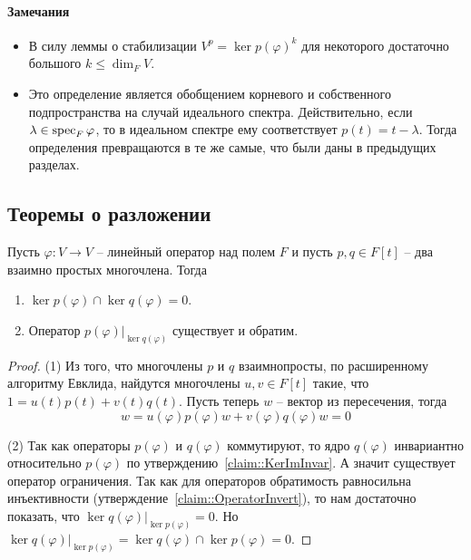 \paragraph{Замечания}
\begin{itemize}
\item В силу леммы о стабилизации $V^p = \ker p(\varphi)^k$ для некоторого достаточно большого $k\leqslant \dim_F V$.

\item Это определение является обобщением корневого и собственного подпространства на случай идеального спектра. Действительно, если $\lambda\in\operatorname{spec}_F \varphi$, то в идеальном спектре ему соответствует $p(t) = t - \lambda$. Тогда определения превращаются в те же самые, что были даны в предыдущих разделах.
\end{itemize}

\subsection{Теоремы о разложении}


\begin{claim}\label{claim::CoprimeKernels}
Пусть $\varphi\colon V\to V$ -- линейный оператор над полем $F$ и пусть $p,q\in F[t]$ -- два взаимно простых многочлена. Тогда 
\begin{enumerate}
\item $\ker p(\varphi)\cap \ker q(\varphi) = 0$.
\item Оператор $p(\varphi)|_{\ker q(\varphi)}$ существует и обратим.
\end{enumerate}
\end{claim}
\begin{proof}
(1)  Из того, что многочлены $p$ и $q$ взаимнопросты, по расширенному алгоритму Евклида, найдутся многочлены $u,v\in F[t]$ такие, что $1 = u(t)p(t) + v(t)q(t)$. Пусть теперь $w$ -- вектор из пересечения, тогда
\[
w = u(\varphi) p(\varphi) w + v(\varphi) q(\varphi) w = 0
\]

(2) Так как операторы $p(\varphi)$ и $q(\varphi)$ коммутируют, то ядро $q(\varphi)$ инвариантно относительно $p(\varphi)$ по утверждению~\ref{claim::KerImInvar}. А значит существует оператор ограничения. Так как для операторов обратимость равносильна инъективности (утверждение~\ref{claim::OperatorInvert}), то нам достаточно показать, что $\ker q(\varphi)|_{\ker p(\varphi)} = 0$. Но $\ker q(\varphi)|_{\ker p(\varphi)} = \ker q(\varphi) \cap \ker p(\varphi) = 0$.
\end{proof}

